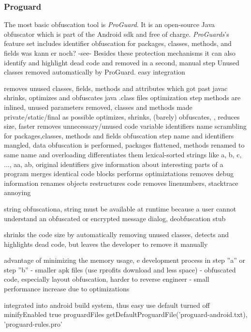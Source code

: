 \subsubsection{Proguard} \label{subsection:counter-obfuscation-solution-proguard}
The most basic obfuscation tool is \textit{ProGuard}.
It is an open-source Java obfuscator which is part of the Android \gls{sdk} and free of charge.
\newline
\textit{ProGuards}'s
feature set includes identifier obfuscation for packages, classes, methods, and fields
was kann er noch? -see- Besides these protection mechanisms it can also
identify and highlight dead code and removed in a second, manual step
Unused classes removed automatically by ProGuard.
easy integration




removes unused classes, fields, methods and attributes which got past javac
shrinks, optimizes and obfuscates java .class files
optimization step methods are inlined, unused parameters removed, classes and methods made private/static/final as possible
optimizes, shrinks, (barely) obfuscates, , reduces size, faster
removes unnecessary/unused code
variable identifiers name scrambling for packages,classes, methods and fields
obfuscation step name and identifiers mangled, data obfuscation is performed, packages flattened, methods renamed to same name and overloading differentiates them
lexical-sorted strings like {a, b, c, ..., aa, ab}, original identifiers give information about interesting parts of a program
merges identical code blocks
performs optimiztations
removes debug information
renames objects
restructures code
removes linenumbers, stacktrace annoying

string obfuscationa, string must be available at runtime because a user cannot
understand an obfuscated or encrypted message dialog, deobfuscation stub

shrinks the code size by automatically removing unused classes, detects and highlights dead code, but leaves the developer to remove it manually

advantage of minimizing the memory usage, e development process in step ”a” or step ”b” \newline
- smaller apk files (use rprofits download and less space)
- obfuscated code, especially layout obfuscation, harder to reverse engineer
- small performance increase due to optimizations

integrated into android build system, thus easy use
default turned off
minifyEnabled true
proguardFiles getDefaultProguardFile('proguard-android.txt), 'proguard-rules.pro'
\cite{schulzLabCourse}
\cite{proguardLicensing}
\cite{strazzareLevel0}
\cite{proguard}
\cite{androidProguard}
